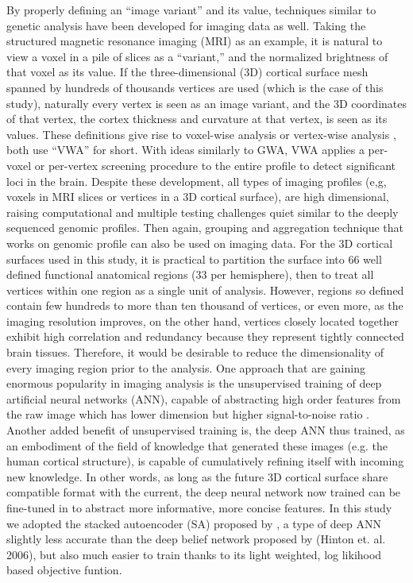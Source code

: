 By properly defining an ``image variant'' and its value, techniques similar to genetic analysis have been developed for imaging data as well. Taking the structured magnetic resonance imaging (MRI) as an example, it is natural to view a voxel in a pile of slices as a “variant,” and the normalized brightness of that voxel as its value. If the three-dimensional (3D) cortical surface mesh spanned by hundreds of thousands vertices are used (which is the case of this study), naturally every vertex is seen as an image variant, and the 3D coordinates of that vertex, the cortex thickness and curvature at that vertex, is seen as its values. These definitions give rise to voxel-wise analysis \cite{VWA1, VWA2, VWA3, VWA4} or vertex-wise analysis \cite{FS:Anl1, FS:Anl2}, both use ``VWA'' for short. With ideas similarly to GWA, VWA applies a per-voxel or per-vertex screening procedure to the entire profile to detect significant loci in the brain. Despite these development, all types of imaging profiles (e,g, voxels in MRI slices or vertices in a 3D cortical surface), are high dimensional, raising computational and multiple testing challenges quiet similar to the deeply sequenced genomic profiles. Then again, grouping and aggregation technique that works on genomic profile can also be used on imaging data. For the 3D cortical surfaces used in this study, it is practical to partition the surface into 66 well defined functional anatomical regions (33 per hemisphere), then to treat all vertices within one region as a single unit of analysis. However, regions so defined contain few hundreds to more than ten thousand of vertices, or even more, as the imaging resolution improves, on the other hand, vertices closely located together exhibit high correlation and redundancy because they represent tightly connected brain tissues. Therefore, it would be desirable to reduce the dimensionality of every imaging region prior to the analysis. One approach that are gaining enormous popularity in imaging analysis is the unsupervised training of deep artificial neural networks (ANN), capable of abstracting high order features from the raw image which has lower dimension but higher signal-to-noise ratio \cite{DL:Intro1, DL:SDA1, DL:Intro2}. Another added benefit of unsupervised training is, the deep ANN thus trained, as an embodiment of the field of knowledge that generated these images (e.g. the human cortical structure), is capable of cumulatively refining itself with incoming new knowledge. In other words, as long as the future 3D cortical surface share compatible format with the current, the deep neural network now trained can be fine-tuned in to abstract more informative, more concise features. In this study we adopted the stacked autoencoder (SA) proposed by \cite{DL:SDA1, DL:Intro2}, a type of deep ANN slightly less accurate than the deep belief network proposed by (Hinton et. al. 2006), but also much easier to train thanks to its light weighted, log likihood based objective funtion.

